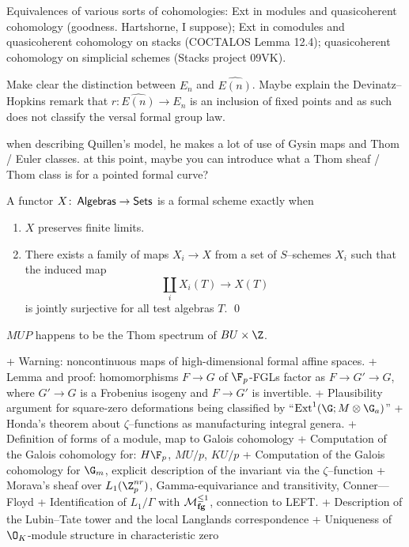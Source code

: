 \documentclass[12pt]{book}
\begin{document}
Equivalences of various sorts of cohomologies: Ext in modules and quasicoherent cohomology (goodness. Hartshorne, I suppose); Ext in comodules and quasicoherent cohomology on stacks (COCTALOS Lemma 12.4); quasicoherent cohomology on simplicial schemes (Stacks project 09VK).

Make clear the distinction between $E_n$ and $\widehat{E(n)}$. Maybe explain the Devinatz--Hopkins remark that $r: \widehat{E(n)} \to E_n$ is an inclusion of fixed points and as such does not classify the versal formal group law.


when describing Quillen's model, he makes a lot of use of Gysin maps and Thom / Euler classes. at this point, maybe you can introduce what a Thom sheaf / Thom class is for a pointed formal curve?




\begin{lemma}
A functor $X\colon\thinspace \mathsf{Algebras} \to \mathsf{Sets}$ is a formal scheme exactly when
\begin{enumerate}
\item $X$ preserves finite limits.
\item There exists a family of maps $X_i \to X$ from a set of $S$--schemes $X_i$ such that the induced map \[\coprod_i X_i(T) \to X(T)\] is jointly surjective for all test algebras $T$. \qed
\end{enumerate}
\end{lemma}





$MUP$ happens to be the Thom spectrum of $BU \times \Z$.







+ Warning: noncontinuous maps of high-dimensional formal affine spaces.
+ Lemma and proof: homomorphisms $F \to G$ of $\F_p$-FGLs factor as $F \to G' \to G$, where $G' \to G$ is a Frobenius isogeny and $F \to G'$ is invertible.
+ Plausibility argument for square-zero deformations being classified by ``$\Ext^1(\G; M \otimes \G_a)$''
+ Honda's theorem about $\zeta$--functions as manufacturing integral genera.
+ Definition of forms of a module, map to Galois cohomology
+ Computation of the Galois cohomology for: $H\F_p$, $MU/p$, $KU/p$
+ Computation of the Galois cohomology for $\G_m$, explicit description of the invariant via the $\zeta$--function
+ Morava's sheaf over $L_1(\Z_p^{nr})$, Gamma-equivariance and transitivity, Conner—Floyd
+ Identification of $L_1 / \Gamma$ with $\mathcal{M}_{\mathbf{fg}}^{\le 1}$, connection to LEFT.
+ Description of the Lubin--Tate tower and the local Langlands correspondence
+ Uniqueness of $\O_K$-module structure in characteristic zero
\end{document}
